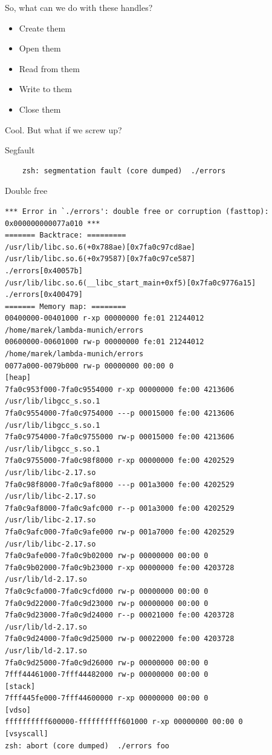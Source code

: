 \documentclass{beamer}
\begin{document}
\begin{frame}
  So, what can we do with these handles?
  \pause
  \begin{itemize}
    \item Create them
    \item Open them
    \item Read from them
    \item Write to them
    \item Close them
  \end{itemize}
  \pause
  Cool.
  \pause
  \alert{But what if we screw up?}
\end{frame}

\begin{frame}[fragile]{Segfault}
  \begin{verbatim}
    zsh: segmentation fault (core dumped)  ./errors
  \end{verbatim}
\end{frame}

\begin{frame}[fragile]{Double free}
\begin{verbatim}
*** Error in `./errors': double free or corruption (fasttop): 0x000000000077a010 ***
======= Backtrace: =========
/usr/lib/libc.so.6(+0x788ae)[0x7fa0c97cd8ae]
/usr/lib/libc.so.6(+0x79587)[0x7fa0c97ce587]
./errors[0x40057b]
/usr/lib/libc.so.6(__libc_start_main+0xf5)[0x7fa0c9776a15]
./errors[0x400479]
======= Memory map: ========
00400000-00401000 r-xp 00000000 fe:01 21244012                           /home/marek/lambda-munich/errors
00600000-00601000 rw-p 00000000 fe:01 21244012                           /home/marek/lambda-munich/errors
0077a000-0079b000 rw-p 00000000 00:00 0                                  [heap]
7fa0c953f000-7fa0c9554000 r-xp 00000000 fe:00 4213606                    /usr/lib/libgcc_s.so.1
7fa0c9554000-7fa0c9754000 ---p 00015000 fe:00 4213606                    /usr/lib/libgcc_s.so.1
7fa0c9754000-7fa0c9755000 rw-p 00015000 fe:00 4213606                    /usr/lib/libgcc_s.so.1
7fa0c9755000-7fa0c98f8000 r-xp 00000000 fe:00 4202529                    /usr/lib/libc-2.17.so
7fa0c98f8000-7fa0c9af8000 ---p 001a3000 fe:00 4202529                    /usr/lib/libc-2.17.so
7fa0c9af8000-7fa0c9afc000 r--p 001a3000 fe:00 4202529                    /usr/lib/libc-2.17.so
7fa0c9afc000-7fa0c9afe000 rw-p 001a7000 fe:00 4202529                    /usr/lib/libc-2.17.so
7fa0c9afe000-7fa0c9b02000 rw-p 00000000 00:00 0 
7fa0c9b02000-7fa0c9b23000 r-xp 00000000 fe:00 4203728                    /usr/lib/ld-2.17.so
7fa0c9cfa000-7fa0c9cfd000 rw-p 00000000 00:00 0 
7fa0c9d22000-7fa0c9d23000 rw-p 00000000 00:00 0 
7fa0c9d23000-7fa0c9d24000 r--p 00021000 fe:00 4203728                    /usr/lib/ld-2.17.so
7fa0c9d24000-7fa0c9d25000 rw-p 00022000 fe:00 4203728                    /usr/lib/ld-2.17.so
7fa0c9d25000-7fa0c9d26000 rw-p 00000000 00:00 0 
7fff44461000-7fff44482000 rw-p 00000000 00:00 0                          [stack]
7fff445fe000-7fff44600000 r-xp 00000000 00:00 0                          [vdso]
ffffffffff600000-ffffffffff601000 r-xp 00000000 00:00 0                  [vsyscall]
zsh: abort (core dumped)  ./errors foo
\end{verbatim}
\end{frame}
\end{document}
